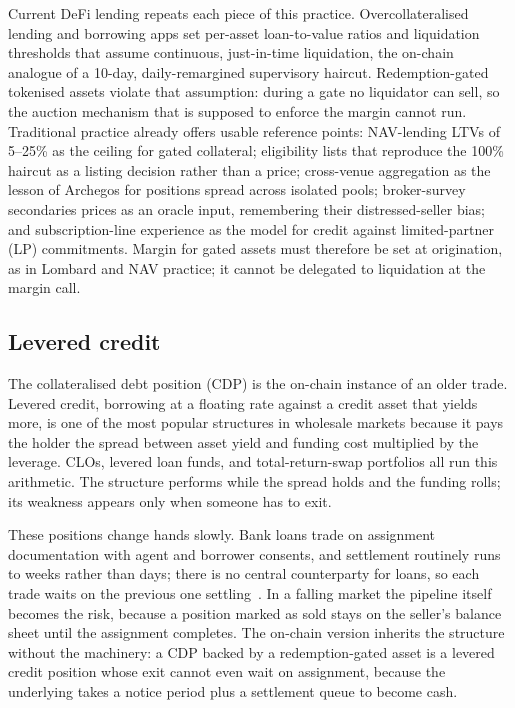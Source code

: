 \documentclass[11pt,a4paper]{article}
\begin{document}
Current DeFi lending repeats each piece of this practice. Overcollateralised lending and borrowing apps set per-asset loan-to-value ratios and liquidation thresholds that assume continuous, just-in-time liquidation, the on-chain analogue of a 10-day, daily-remargined supervisory haircut. Redemption-gated tokenised assets violate that assumption: during a gate no liquidator can sell, so the auction mechanism that is supposed to enforce the margin cannot run. Traditional practice already offers usable reference points: NAV-lending LTVs of 5--25\% as the ceiling for gated collateral; eligibility lists that reproduce the 100\% haircut as a listing decision rather than a price; cross-venue aggregation as the lesson of Archegos for positions spread across isolated pools; broker-survey secondaries prices as an oracle input, remembering their distressed-seller bias; and subscription-line experience as the model for credit against limited-partner (LP) commitments. Margin for gated assets must therefore be set at origination, as in Lombard and NAV practice; it cannot be delegated to liquidation at the margin call.

\subsection{Levered credit}

The collateralised debt position (CDP) is the on-chain instance of an older trade. Levered credit, borrowing at a floating rate against a credit asset that yields more, is one of the most popular structures in wholesale markets because it pays the holder the spread between asset yield and funding cost multiplied by the leverage. CLOs, levered loan funds, and total-return-swap portfolios all run this arithmetic. The structure performs while the spread holds and the funding rolls; its weakness appears only when someone has to exit.

These positions change hands slowly. Bank loans trade on assignment documentation with agent and borrower consents, and settlement routinely runs to weeks rather than days; there is no central counterparty for loans, so each trade waits on the previous one settling~\cite{lsta}. In a falling market the pipeline itself becomes the risk, because a position marked as sold stays on the seller's balance sheet until the assignment completes. The on-chain version inherits the structure without the machinery: a CDP backed by a redemption-gated asset is a levered credit position whose exit cannot even wait on assignment, because the underlying takes a notice period plus a settlement queue to become cash.
\end{document}
